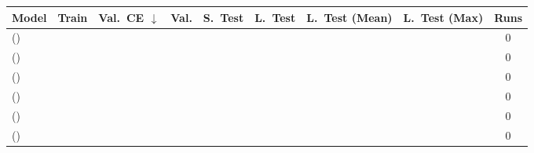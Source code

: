 \begin{tabular}{@{}lcccccccc@{}}
\toprule
Model & Train & Val.\ CE $\downarrow$ & Val. & S.\ Test & L.\ Test & L.\ Test (Mean) & L.\ Test (Max) & Runs \\
\midrule
\transformerabbrev{} (\validationshortabbrev{}) &  &  &  &  &  &  &  & 0 \\
\transformerabbrev{} (\validationlongabbrev{}) &  &  &  &  &  &  &  & 0 \\
\rnnabbrev{} (\validationshortabbrev{}) &  &  &  &  &  &  &  & 0 \\
\rnnabbrev{} (\validationlongabbrev{}) &  &  &  &  &  &  &  & 0 \\
\lstmabbrev{} (\validationshortabbrev{}) &  &  &  &  &  &  &  & 0 \\
\lstmabbrev{} (\validationlongabbrev{}) &  &  &  &  &  &  &  & 0 \\
\bottomrule
\end{tabular}
